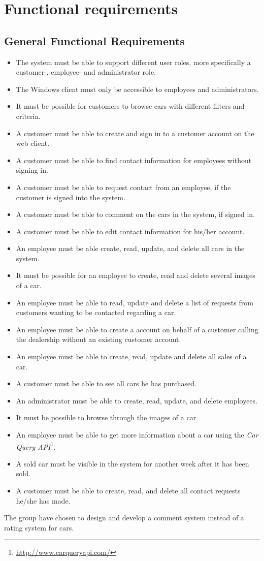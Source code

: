 \section{Functional requirements}

\subsection{General Functional Requirements}
\begin{itemize}
	\item The system must be able to support different user roles, more specifically a customer-, employee- and administrator role.
	\item The Windows client must only be accessible to employees and administrators.
    \item It must be possible for customers to browse cars with different filters and criteria.
    \item A customer must be able to create and sign in to a customer account on the web client.
    \item A customer must be able to find contact information for employees without signing in.
    \item A customer must be able to request contact from an employee, if the customer is signed into the system.
    \item A customer must be able to comment on the cars in the system, if signed in.
    \item A customer must be able to edit contact information for his/her account.
    \item An employee must be able create, read, update, and delete all cars in the system.
    \item It must be possible for an employee to create, read and delete several images of a car.
    \item An employee must be able to read, update and delete a list of requests from customers wanting to be contacted regarding a car.
    \item An employee must be able to create a account on behalf of a customer calling the dealership without an existing customer account.
    \item An employee must be able to create, read, update and delete all sales of a car.
    \item A customer must be able to see all cars he has purchased.
    \item An administrator must be able to create, read, update, and delete employees.
    \item It must be possible to browse through the images of a car.
    \item An employee must be able to get more information about a car using the \textit{Car Query API}\footnote{\url{http://www.carqueryapi.com/}}.
    \item A sold car must be visible in the system for another week after it has been sold.
    \item A customer must be able to create, read, and delete all contact requests he/she has made.
\end{itemize}
The group have chosen to design and develop a comment system instead of a rating system for cars.

